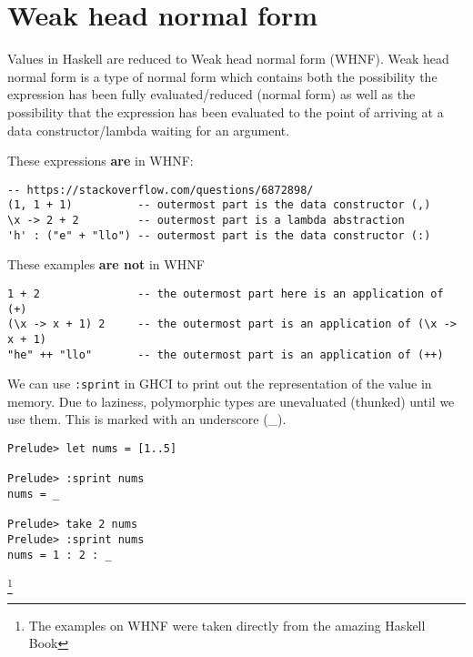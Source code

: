 \section{Weak head normal form}
Values in Haskell are reduced to Weak head normal form (WHNF).
Weak head normal form is a type of normal form which contains both the possibility the expression has been fully evaluated/reduced (normal form) as well as the possibility that the expression has been evaluated to the point of arriving at a data constructor/lambda waiting for an argument.

These expressions \textbf{are} in WHNF:

\begin{lstlisting}[linewidth=15cm]
-- https://stackoverflow.com/questions/6872898/
(1, 1 + 1)          -- outermost part is the data constructor (,)
\x -> 2 + 2         -- outermost part is a lambda abstraction
'h' : ("e" + "llo") -- outermost part is the data constructor (:)
\end{lstlisting}

These examples \textbf{are not} in WHNF
\begin{lstlisting}[linewidth=15cm]
1 + 2               -- the outermost part here is an application of (+)
(\x -> x + 1) 2     -- the outermost part is an application of (\x -> x + 1)
"he" ++ "llo"       -- the outermost part is an application of (++)    
\end{lstlisting}

We can use \texttt{:sprint} in GHCI to print out the representation of the value in memory. Due to laziness, polymorphic types are unevaluated (thunked) until we use them. This is marked with an underscore (\_).

\begin{verbatim}
Prelude> let nums = [1..5]

Prelude> :sprint nums
nums = _

Prelude> take 2 nums
Prelude> :sprint nums
nums = 1 : 2 : _
\end{verbatim}

\footnote{The examples on WHNF were taken directly from the amazing Haskell Book}